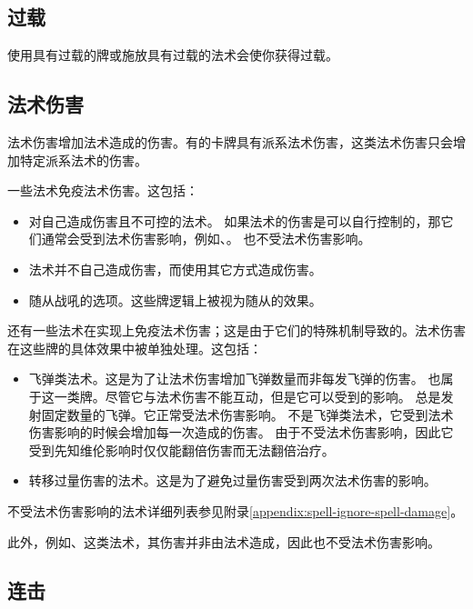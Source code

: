 \subsection{过载}
\label{overload}

使用具有过载的牌或施放具有过载的法术会使你获得过载。

\subsection{法术伤害}
\label{spell-damage}

法术伤害增加法术造成的伤害。有的卡牌具有派系法术伤害，这类法术伤害只会增加特定派系法术的伤害。

一些法术免疫法术伤害。这包括：
\begin{itemize}
    \item 对自己造成伤害且不可控的法术。
        \notice 如果法术的伤害是可以自行控制的，那它们通常会受到法术伤害影响，例如、。
        \exception {}也不受法术伤害影响。
    \item 法术并不自己造成伤害，而使用其它方式造成伤害。
    \item 随从战吼的选项。这些牌逻辑上被视为随从的效果。
\end{itemize}

还有一些法术在实现上免疫法术伤害；这是由于它们的特殊机制导致的。法术伤害在这些牌的具体效果中被单独处理。这包括：
\begin{itemize}
    \item 飞弹类法术。这是为了让法术伤害增加飞弹数量而非每发飞弹的伤害。
        \notice {}也属于这一类牌。尽管它与法术伤害不能互动，但是它可以受到的影响。
        \exception {}总是发射固定数量的飞弹。它正常受法术伤害影响。
        \exception {}不是飞弹类法术，它受到法术伤害影响的时候会增加每一次造成的伤害。
        \notice 由于不受法术伤害影响，因此它受到先知维伦影响时仅仅能翻倍伤害而无法翻倍治疗。
    \item 转移过量伤害的法术。这是为了避免过量伤害受到两次法术伤害的影响。
\end{itemize}
不受法术伤害影响的法术详细列表参见附录\ref{appendix:spell-ignore-spell-damage}。

此外，例如、这类法术，其伤害并非由法术造成，因此也不受法术伤害影响。

\subsection{连击}
\label{combo}

